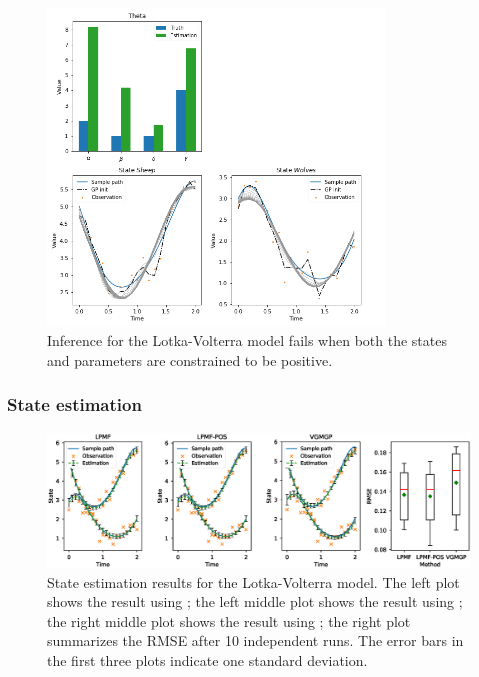 \begin{figure}
    \centering
    \includegraphics[width=0.8\textwidth]{graphics/lotka-fail}
    \caption{Inference for the Lotka-Volterra model fails when both the states and parameters are constrained to be positive.}
    \label{fig-lotka-fail}
\end{figure}

\subsubsection*{State estimation}

\begin{figure}
    \centering
    \includegraphics[width=\textwidth]{graphics/lotka-states}
    \caption{State estimation results for the Lotka-Volterra model. The left plot shows the result using \algolpmf; the left middle plot shows the result using \algolpmfpos; the right middle plot shows the result using \algovgmgp; the right plot summarizes the RMSE after 10 independent runs. The error bars in the first three plots indicate one standard deviation.}
    \label{fig-lotka-state}
\end{figure}


